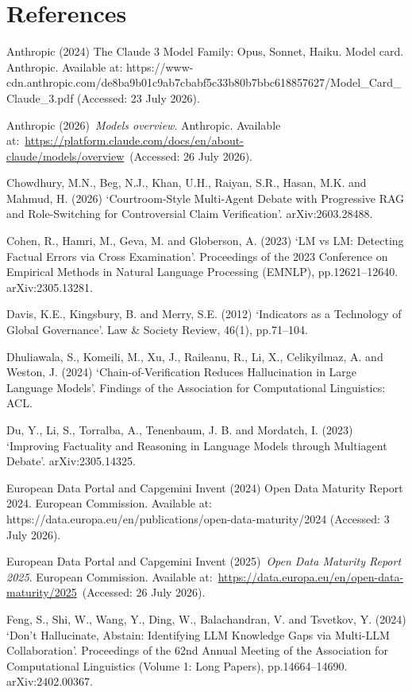 \chapter{References}\label{ch:references}

Anthropic (2024) The Claude 3 Model Family: Opus, Sonnet, Haiku. Model card. Anthropic. Available at: https://www-cdn.anthropic.com/de8ba9b01c9ab7cbabf5c33b80b7bbc618857627/Model\_Card\_Claude\_3.pdf (Accessed: 23 July 2026).

Anthropic (2026)~\emph{Models overview}. Anthropic. Available at:~\url{https://platform.claude.com/docs/en/about-claude/models/overview}~(Accessed: 26 July 2026).

Chowdhury, M.N., Beg, N.J., Khan, U.H., Raiyan, S.R., Hasan, M.K. and Mahmud, H. (2026) `Courtroom-Style Multi-Agent Debate with Progressive RAG and Role-Switching for Controversial Claim Verification'. arXiv:2603.28488.

Cohen, R., Hamri, M., Geva, M. and Globerson, A. (2023) `LM vs LM: Detecting Factual Errors via Cross Examination'. Proceedings of the 2023 Conference on Empirical Methods in Natural Language Processing (EMNLP), pp.12621--12640. arXiv:2305.13281.

Davis, K.E., Kingsbury, B. and Merry, S.E. (2012) `Indicators as a Technology of Global Governance'. Law \& Society Review, 46(1), pp.71--104.

Dhuliawala, S., Komeili, M., Xu, J., Raileanu, R., Li, X., Celikyilmaz, A. and Weston, J. (2024) `Chain-of-Verification Reduces Hallucination in Large Language Models'. Findings of the Association for Computational Linguistics: ACL.

Du, Y., Li, S., Torralba, A., Tenenbaum, J. B. and Mordatch, I. (2023) `Improving Factuality and Reasoning in Language Models through Multiagent Debate'. arXiv:2305.14325.

European Data Portal and Capgemini Invent (2024) Open Data Maturity Report 2024. European Commission. Available at: https://data.europa.eu/en/publications/open-data-maturity/2024 (Accessed: 3 July 2026).

European Data Portal and Capgemini Invent (2025)~\emph{Open Data Maturity Report 2025}. European Commission. Available at:~\url{https://data.europa.eu/en/open-data-maturity/2025}~(Accessed: 26 July 2026).

Feng, S., Shi, W., Wang, Y., Ding, W., Balachandran, V. and Tsvetkov, Y. (2024) `Don't Hallucinate, Abstain: Identifying LLM Knowledge Gaps via Multi-LLM Collaboration'. Proceedings of the 62nd Annual Meeting of the Association for Computational Linguistics (Volume 1: Long Papers), pp.14664--14690. arXiv:2402.00367.

